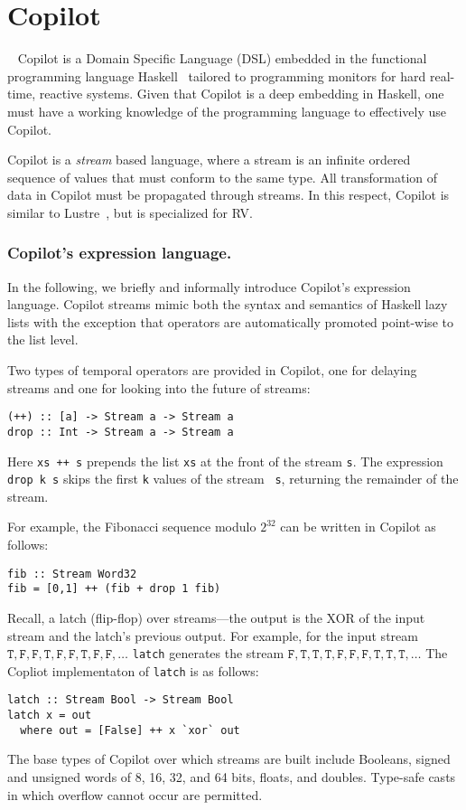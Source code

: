 \section{Copilot}~\label{sec:co-intro} 
Copilot is a Domain Specific Language (DSL)  embedded in the functional
programming language Haskell~\cite{Haskell98}   tailored to
programming monitors for hard real-time, reactive systems. Given that
Copilot is a deep embedding in Haskell, one must have a working
knowledge of the programming language to effectively use Copilot. 

 Copilot is a \emph{stream} based language, where a stream is an infinite ordered
 sequence of values that must conform to the same type.  All
 transformation of data in Copilot must be propagated through
 streams.  In this respect, Copilot is similar to 
 Lustre~\cite{CaspiPHP87}, but is specialized for RV. 



\subsubsection{Copilot's expression language.}
In the following, we briefly and informally introduce Copilot's expression
language.  Copilot streams mimic both the syntax and semantics of
Haskell lazy lists with the exception that  operators are
automatically promoted point-wise to the list level. 

Two types of temporal operators are provided in Copilot, one for
delaying streams and one for looking into the future of streams:
\begin{lstlisting}[frame=single]
(++) :: [a] -> Stream a -> Stream a
drop :: Int -> Stream a -> Stream a
\end{lstlisting}
%
Here {\tt xs ++ s} prepends the list {\tt xs} at the front of the stream {\tt s}.
The expression {\tt drop k s} skips the first {\tt k} values of the stream {\tt
  s}, returning the remainder of the stream.



 For example, the Fibonacci sequence modulo $2^{32}$ can be written in Copilot as follows:

\begin{lstlisting}[frame=single]
fib :: Stream Word32
fib = [0,1] ++ (fib + drop 1 fib)
\end{lstlisting}
%
Recall, a 
latch (flip-flop) over streams---the output is the XOR of the input stream and
the latch's previous output.  For example, for the input stream
$\mathtt{T, F, F, T, F, F, T, F, F,}\dots$
{\tt latch} generates the stream
$\mathtt{F, T, T, T, F, F, F, T, T, T,}\ldots$
The Copliot implementaton of {\tt latch} is as follows:
%
\begin{lstlisting}[frame=single]
latch :: Stream Bool -> Stream Bool
latch x = out
  where out = [False] ++ x `xor` out
\end{lstlisting}
%
The base types of Copilot over which streams are built include Booleans, signed
and unsigned words of 8, 16, 32, and 64 bits, floats, and doubles. Type-safe
casts in which overflow cannot occur are permitted.

